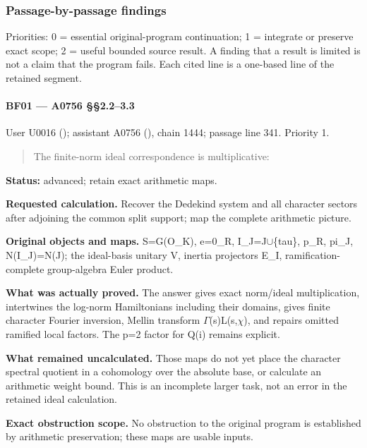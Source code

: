 \subsubsection{Passage-by-passage
findings}\label{passage-by-passage-findings}

Priorities: 0 = essential original-program continuation; 1 = integrate
or preserve exact scope; 2 = useful bounded source result. A finding
that a result is limited is not a claim that the program fails. Each
cited line is a one-based line of the retained segment.

\paragraph{BF01 --- A0756 §§2.2--3.3}\label{bf01-a0756-2.23.3}

User U0016 (\protect{});
assistant A0756 (\protect{}),
chain 1444; passage line 341. Priority 1.

\begin{quote}
The finite-norm ideal correspondence is multiplicative:
\end{quote}

\textbf{Status:} advanced; retain exact arithmetic maps.

\textbf{Requested calculation.} Recover the Dedekind system and all
character sectors after adjoining the common split support; map the
complete arithmetic picture.

\textbf{Original objects and maps.} S=G(O\_K), e=0\_R,
I\_J=J\allowbreak{}\ensuremath{∪}\allowbreak{}\{tau\}, p\_R, pi\_J,
N(I\_J)=N(J); the ideal-basis unitary V, inertia projectors E\_I,
ramification-complete group-algebra Euler product.

\textbf{What was actually proved.} The answer gives exact norm/ideal
multiplication, intertwines the log-norm Hamiltonians including their
domains, gives finite character Fourier inversion, Mellin transform
\allowbreak{}\ensuremath{Γ}\allowbreak{}(s)L(s,\allowbreak{}\ensuremath{χ}\allowbreak{}),
and repairs omitted ramified local factors. The p=2 factor for Q(i)
remains explicit.

\textbf{What remained uncalculated.} Those maps do not yet place the
character spectral quotient in a cohomology over the absolute base, or
calculate an arithmetic weight bound. This is an incomplete larger task,
not an error in the retained ideal calculation.

\textbf{Exact obstruction scope.} No obstruction to the original program
is established by arithmetic preservation; these maps are usable inputs.


